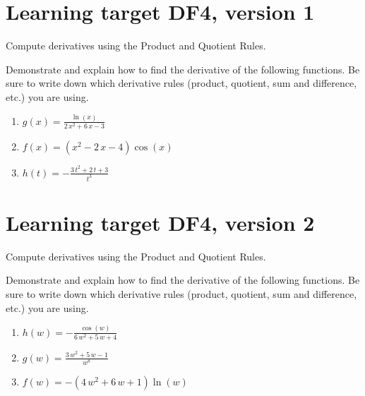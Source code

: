 
\usepackage{pgfplots}

\everymath{\displaystyle}


\section{Learning target DF4, version 1}

Compute derivatives using the Product and Quotient Rules.

\hrulefill

Demonstrate and explain how to find the derivative of the following functions. Be sure to write down which derivative rules (product, quotient, sum and difference, etc.) you are using.

\begin{enumerate}
    \item \(\renewcommand{\log}{\ln} g(x)= \frac{\log\left(x\right)}{2 \, x^{2} + 6 \, x - 3}\)
    \vfill
    \item \(\renewcommand{\log}{\ln} f(x)= {\left(x^{2} - 2 \, x - 4\right)} \cos\left(x\right)\)
    \vfill
    \item \(\renewcommand{\log}{\ln} h(t)= -\frac{3 \, t^{2} + 2 \, t + 3}{t^{3}}\)
    \vfill
\end{enumerate}



\pagebreak

\section{Learning target DF4, version 2}

Compute derivatives using the Product and Quotient Rules.

\hrulefill

Demonstrate and explain how to find the derivative of the following functions. Be sure to write down which derivative rules (product, quotient, sum and difference, etc.) you are using.

\begin{enumerate}
    \item \(\renewcommand{\log}{\ln} h(w)= -\frac{\cos\left(w\right)}{6 \, w^{2} + 5 \, w + 4}\)
    \vfill
    \item \( \renewcommand{\log}{\ln} g(w)= \frac{3 \, w^{2} + 5 \, w - 1}{w^{8}}\)
    \vfill
    \item \(\renewcommand{\log}{\ln} f(w)= -{\left(4 \, w^{2} + 6 \, w + 1\right)} \log\left(w\right)\)
    \vfill
\end{enumerate}


